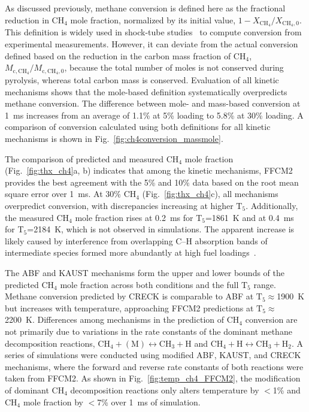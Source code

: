 As discussed previously, methane conversion is defined here as the fractional reduction in CH$_4$ mole fraction, normalized by its initial value, $1 - X_{\mathrm{CH_4}}/X_{\mathrm{CH_4,0}}$. This definition is widely used in shock-tube studies~\cite{agafonov2011shock, ferris2024experimental, panda2025understanding} to compute conversion from experimental measurements. However, it can deviate from the actual conversion defined based on the reduction in the carbon mass fraction of CH$_4$, $M_{\mathrm{c,CH_4}}/M_{\mathrm{c,CH_4,0}}$, because the total number of moles is not conserved during pyrolysis, whereas total carbon mass is conserved. Evaluation of all kinetic mechanisms shows that the mole-based definition systematically overpredicts methane conversion. The difference between mole- and mass-based conversion at 1~ms increases from an average of 1.1\% at 5\% loading to 5.8\% at 30\% loading. A comparison of conversion calculated using both definitions for all kinetic mechanisms is shown in Fig.~\ref{fig:ch4conversion_massmole}.



The comparison of predicted and measured CH$_4$ mole fraction (Fig.~\ref{fig:thx_ch4}a, b) indicates that among the kinetic mechanisms, FFCM2 provides the best agreement with the 5\% and 10\% data based on the root mean square error over 1~ms. At 30\% CH$_4$ (Fig.~\ref{fig:thx_ch4}c), all mechanisms overpredict conversion, with discrepancies increasing at higher $\mathrm{T_5}$. Additionally, the measured CH$_4$ mole fraction rises at 0.2~ms for T$_5$=1861~K and at 0.4~ms for T$_5$=2184~K, which is not observed in simulations. The apparent increase is likely caused by interference from overlapping C–H absorption bands of intermediate species formed more abundantly at high fuel loadings~\citep{ferris2024experimental}.





The ABF and KAUST mechanisms form the upper and lower bounds of the predicted CH$_4$ mole fraction across both conditions and the full $\mathrm{T_5}$ range. Methane conversion predicted by CRECK is comparable to ABF at $\mathrm{T_5}$$\approx$1900~K but increases with temperature, approaching FFCM2 predictions at $\mathrm{T_5}$$\approx$2200~K. Differences among mechanisms in the prediction of CH$_4$ conversion are not primarily due to variations in the rate constants of the dominant methane decomposition reactions, $\mathrm{CH_4+(M)\leftrightarrow CH_3+H}$ and $\mathrm{CH_4+H\leftrightarrow CH_3+H_2}$. A series of simulations were conducted using modified ABF, KAUST, and CRECK mechanisms, where the forward and reverse rate constants of both reactions were taken from FFCM2. As shown in Fig.~\ref{fig:temp_ch4_FFCM2}, the modification of dominant CH$_4$ decomposition reactions only alters temperature by $<$1\% and CH$_4$ mole fraction by $<$7\% over 1~ms of simulation.

